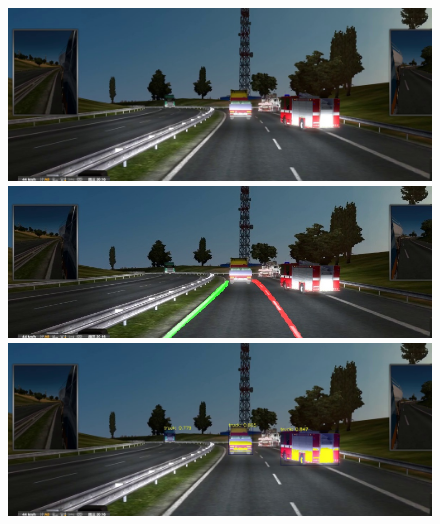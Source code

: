 \documentclass[runningheads]{llncs}
\begin{document}
\begin{figure}[!htb]
	\includegraphics[width=\linewidth]{result/w000139.jpg}
	\endminipage\hfill
	\includegraphics[width=\linewidth]{result/w000139-lane.jpg}
	\endminipage\hfill
	\includegraphics[width=\linewidth]{result/w000139-obj.jpg}
	\endminipage


\end{figure}
\end{document}
